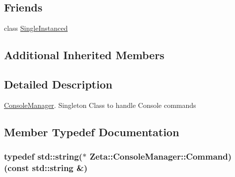 \subsection*{Friends}
\begin{DoxyCompactItemize}
\item 
class \hyperlink{classZeta_1_1ConsoleManager_a2fa95d69b32a77fffa4b730679a8b08c}{Single\+Instanced}
\end{DoxyCompactItemize}
\subsection*{Additional Inherited Members}


\subsection{Detailed Description}
\hyperlink{classZeta_1_1ConsoleManager}{Console\+Manager}. Singleton Class to handle Console commands 

\subsection{Member Typedef Documentation}
\hypertarget{classZeta_1_1ConsoleManager_a24cbcf9867d966f7e17af66a3f7f2df2}{
\subsubsection[{Command}]{\setlength{\rightskip}{0pt plus 5cm}typedef std\+::string($\ast$ Zeta\+::\+Console\+Manager\+::\+Command)(const std\+::string \&)}}\label{classZeta_1_1ConsoleManager_a24cbcf9867d966f7e17af66a3f7f2df2}


